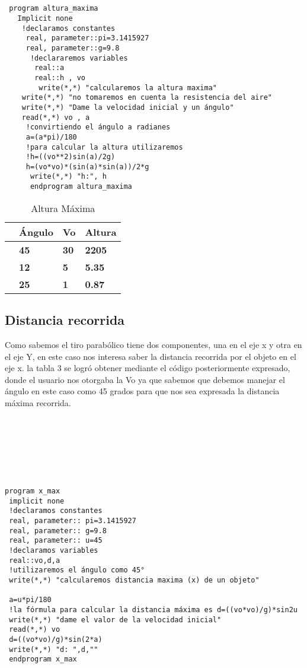 \documentclass{article}
\begin{document}
\begin{verbatim}
 
 
 program altura_maxima
   Implicit none
    !declaramos constantes
     real, parameter::pi=3.1415927
     real, parameter::g=9.8
      !declararemos variables
       real::a 
       real::h , vo
        write(*,*) "calcularemos la altura maxima"
	write(*,*) "no tomaremos en cuenta la resistencia del aire"
	write(*,*) "Dame la velocidad inicial y un ángulo"
	read(*,*) vo , a
	 !convirtiendo el ángulo a radianes
	 a=(a*pi)/180
	 !para calcular la altura utilizaremos
	 !h=((vo**2)sin(a)/2g)
	 h=(vo*vo)*(sin(a)*sin(a))/2*g
	  write(*,*) "h:", h
	  endprogram altura_maxima

\end{verbatim}

\begin{table}[]
\centering
\caption{Altura Máxima}
\label{my-label}
\begin{tabular}{|l|l|l|l|}
\hline
\textbf{} & \textbf{Ángulo} & \textbf{Vo} & \textbf{Altura} \\ \hline
\textbf{} & \textbf{45}     & \textbf{30} & \textbf{2205}   \\ \hline
\textbf{} & \textbf{12}     & \textbf{5}  & \textbf{5.35}   \\ \hline
\textbf{} & \textbf{25}     & \textbf{1}  & \textbf{0.87}   \\ \hline
\end{tabular}
\end{table}

\subsection{Distancia recorrida }
Como sabemos el tiro parabólico tiene dos componentes, una en el eje x y otra en el eje Y, en este caso nos interesa saber la distancia recorrida por el objeto en el eje x.   la tabla 3 se logró obtener mediante el código posteriormente expresado, donde el usuario nos otorgaba la Vo ya que sabemos que debemos manejar el ángulo  en este caso como 45 grados para que nos sea expresada la distancia máxima recorrida.

\begin{verbatim}







program x_max
 implicit none
 !declaramos constantes
 real, parameter:: pi=3.1415927
 real, parameter:: g=9.8
 real, parameter:: u=45
 !declaramos variables
 real::vo,d,a
 !utilizaremos el ángulo como 45°
 write(*,*) "calcularemos distancia maxima (x) de un objeto"

 a=u*pi/180
 !la fórmula para calcular la distancia máxima es d=((vo*vo)/g)*sin2u
 write(*,*) "dame el valor de la velocidad inicial"
 read(*,*) vo
 d=((vo*vo)/g)*sin(2*a)
 write(*,*) "d: ",d,""
 endprogram x_max
\end{verbatim}
\end{document}
